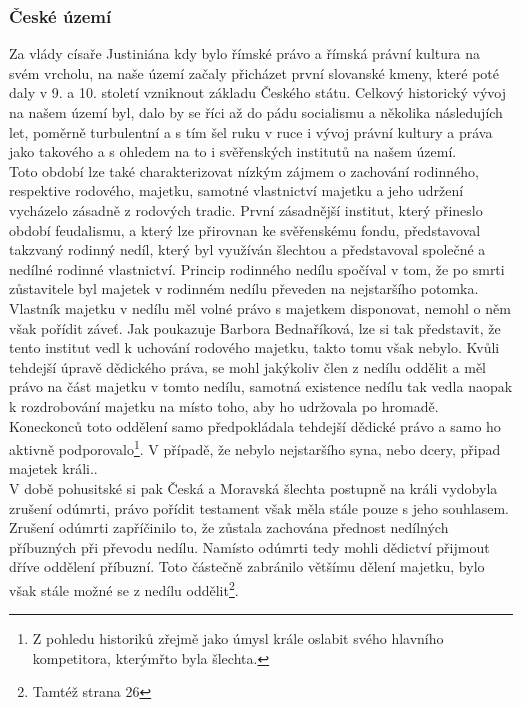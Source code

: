 \documentclass{article}
\begin{document}
\subsubsection{České území}

Za vlády císaře Justiniána kdy bylo římské právo a římská právní kultura na svém vrcholu, na naše území začaly přicházet první slovanské kmeny, které poté daly v 9. a 10. století vzniknout základu Českého státu. Celkový historický vývoj na našem území byl, dalo by se říci až do pádu socialismu a několika následujích let, poměrně turbulentní a s tím šel ruku v ruce i vývoj právní kultury a práva jako takového a s ohledem na to i svěřenských institutů na našem území. \\

Toto období lze také charakterizovat nízkým zájmem o zachování rodinného, respektive rodového, majetku, samotné vlastnictví majetku a jeho udržení vycházelo zásadně z rodových tradic. První zásadnější institut, který přineslo období feudalismu, a který lze přirovnan ke svěřenskému fondu, představoval takzvaný rodinný nedíl, který byl využíván šlechtou a představoval společné a nedílné rodinné vlastnictví. Princip rodinného nedílu spočíval v tom, že po smrti zůstavitele byl majetek v rodinném nedílu převeden na nejstaršího potomka. Vlastník majetku v nedílu měl volné právo s majetkem disponovat, nemohl o něm však pořídit záveť. Jak poukazuje Barbora Bednaříková, lze si tak představit, že tento institut vedl k uchování rodového majetku, takto tomu však nebylo. Kvůli tehdejší úpravě dědického práva, se mohl jakýkoliv člen z nedílu oddělit a měl právo na část majetku v tomto nedílu, samotná existence nedílu tak vedla naopak k rozdrobování majetku na místo toho, aby ho udržovala po hromadě. Koneckonců toto oddělení samo předpokládala tehdejší dědické právo a samo ho aktivně podporovalo\footnote{Z pohledu historiků zřejmě jako úmysl krále oslabit svého hlavního kompetitora, kterýmřto byla šlechta.}. V případě, že nebylo nejstaršího syna, nebo dcery, připad majetek králi..\\

V době pohusitské si pak Česká a Moravská šlechta postupně na králi vydobyla zrušení odúmrti, právo pořídit testament však měla stále pouze s jeho souhlasem. Zrušení odúmrti zapříčinilo to, že zůstala zachována přednost nedílných příbuzných při převodu nedílu. Namísto odúmrti tedy mohli dědictví přijmout dříve oddělení příbuzní. Toto částečně zabránilo většímu dělení majetku, bylo však stále možné se z nedílu oddělit\footnote{Tamtéž strana 26}.\\
\end{document}
